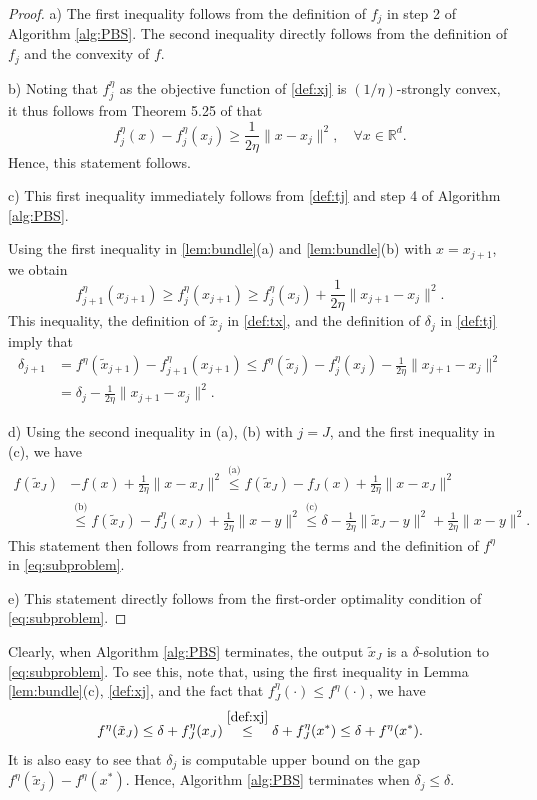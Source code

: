 \documentclass[11pt,letterpaper]{article}
\newcommand{\R}{\mathbb{R}}
\newcommand{\tx}{\tilde x}
\begin{document}
\begin{proof}
a) The first inequality follows from the definition of $f_j$ in step 2 of Algorithm \ref{alg:PBS}.
The second inequality directly follows from the definition of $f_j$ and the convexity of $f$.

b) Noting that $f_j^\eta$ as the objective function of \eqref{def:xj} is $(1/\eta)$-strongly convex, it thus follows from Theorem 5.25 of \cite{beck2017first} that 
\[
f_j^\eta(x) - f_j^\eta(x_j) \ge \frac{1}{2\eta}\|x-x_j\|^2, \quad \forall x\in \R^d.
\]
Hence, this statement follows.

c) This first inequality immediately follows from \eqref{def:tj} and step 4 of Algorithm \ref{alg:PBS}.

Using the first inequality in \ref{lem:bundle}(a) and \ref{lem:bundle}(b) with $x=x_{j+1}$, we obtain
\[
f_{j+1}^\eta(x_{j+1}) \ge f_j^\eta(x_{j+1}) \ge f_j^\eta(x_j) +\frac{1}{2\eta}\|x_{j+1}-x_j\|^2.
\]
This inequality, the definition of $\tx_j$ in \eqref{def:tx}, and the definition of $\delta_j$ in \eqref{def:tj} imply that
\begin{align*}
    \delta_{j+1} &= f^\eta(\tx_{j+1}) - f_{j+1}^\eta(x_{j+1})
    \le f^\eta(\tx_j) - f_j^\eta(x_j) -\frac{1}{2\eta}\|x_{j+1}-x_j\|^2\\
    &= \delta_j -\frac{1}{2\eta}\|x_{j+1}-x_j\|^2.
\end{align*}

d) Using the second inequality in (a), (b) with $j=J$, and the first inequality in (c), we have
  \begin{align*}
    f(\tx_J) &- f(x) + \frac{1}{2\eta}\|x-x_J\|^2 
     \stackrel{\text{(a)}}\le f(\tx_J) - f_J(x) + \frac{1}{2\eta}\|x-x_J\|^2 \\
    & \stackrel{\text{(b)}}\le f(\tx_J) - f_J^\eta(x_J) + \frac{1}{2\eta}\|x-y\|^2
     \stackrel{\text{(c)}}\le \delta - \frac{1}{2\eta}\|\tx_J-y\|^2 + \frac{1}{2\eta}\|x-y\|^2.
\end{align*}
This statement then follows from rearranging the terms and the definition of $f^\eta$ in \eqref{eq:subproblem}.

e) This statement directly follows from the first-order optimality condition of \eqref{eq:subproblem}.
\end{proof}


Clearly, when Algorithm \ref{alg:PBS} terminates, the output $\tilde x_J$ is a $\delta$-solution to \eqref{eq:subproblem}. To see this, note that, using the first inequality in Lemma \ref{lem:bundle}(c), \eqref{def:xj}, and the fact that $f_J^\eta(\cdot)\le f^\eta(\cdot)$, we have
    \[
        f^\eta(\tilde x_J) \le \delta + f_J^\eta(x_J) \overset{\eqref{def:xj}}{\le} \delta + f_J^\eta(x^*) \le \delta + f^\eta(x^*).
    \]
It is also easy to see that $\delta_j$ is computable upper bound on the gap $f^\eta(\tx_j) - f^\eta(x^*)$. Hence, Algorithm \ref{alg:PBS} terminates when $\delta_j \le \delta$. 
\end{document}
